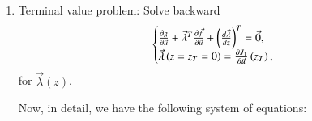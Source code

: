 \documentclass[11pt]{article}
\begin{document}
\begin{enumerate}
	\item Terminal value problem: Solve backward
	\begin{equation}
		\left\{ {\begin{matrix}
				\begin{matrix} 
					\frac{{\partial g}}{{\partial \vec u}} + {{\vec \lambda }^T}\frac{{\partial \vec f}}{{\partial \vec u}} + {\left( {\frac{{d\vec \lambda }}{{dz}}} \right)^T} = \vec 0, \hfill \cr 
					\vec \lambda \left( {{z= z_T = 0}} \right) = \frac{{\partial {J_1}}}{{\partial \vec u}}\left( {{z_T}} \right), \hfill \cr 
				\end{matrix}   \\ 
		\end{matrix} } \right.
		\label{eq0012}
	\end{equation}
	for $\vec \lambda \left( z \right)$.
	
	Now, in detail, we have the following system of equations:
	

\end{enumerate}
\end{document}
